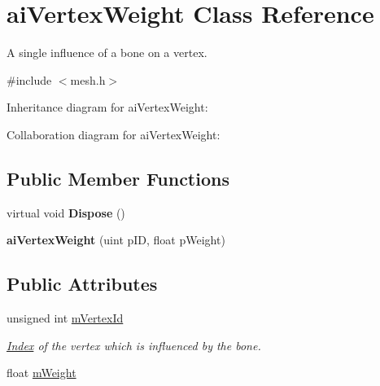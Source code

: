 \hypertarget{structai_vertex_weight}{\section{ai\+Vertex\+Weight Class Reference}
\label{structai_vertex_weight}
}


A single influence of a bone on a vertex.  




{\ttfamily \#include $<$mesh.\+h$>$}



Inheritance diagram for ai\+Vertex\+Weight\+:


Collaboration diagram for ai\+Vertex\+Weight\+:
\subsection*{Public Member Functions}
\begin{DoxyCompactItemize}
\item 
\hypertarget{structai_vertex_weight_a0bc04d57fdbc9be3b55c3656b89ab0ee}{virtual void {\bfseries Dispose} ()}\label{structai_vertex_weight_a0bc04d57fdbc9be3b55c3656b89ab0ee}

\item 
\hypertarget{structai_vertex_weight_a77af2864975ba9c86d8a5950a13b052a}{{\bfseries ai\+Vertex\+Weight} (uint p\+I\+D, float p\+Weight)}\label{structai_vertex_weight_a77af2864975ba9c86d8a5950a13b052a}

\end{DoxyCompactItemize}
\subsection*{Public Attributes}
\begin{DoxyCompactItemize}
\item 
\hypertarget{structai_vertex_weight_af6269cf6a0f02e5ae870a72046d58f4f}{unsigned int \hyperlink{structai_vertex_weight_af6269cf6a0f02e5ae870a72046d58f4f}{m\+Vertex\+Id}}\label{structai_vertex_weight_af6269cf6a0f02e5ae870a72046d58f4f}

\begin{DoxyCompactList}\small\item\em \hyperlink{struct_index}{Index} of the vertex which is influenced by the bone. \end{DoxyCompactList}\item 
float \hyperlink{structai_vertex_weight_abab9c49baabc2cafef9ac840f59e61b8}{m\+Weight}
\end{DoxyCompactItemize}
